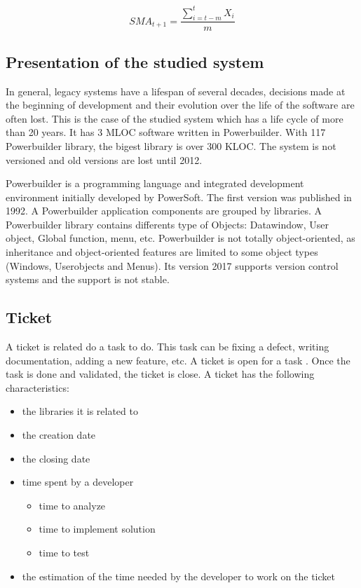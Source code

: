 \documentclass[10pt,conference]{IEEEtran}
\begin{document}
	\begin{equation}
	SMA_{t+1}=\frac{\sum\limits_{i=t-m}^t X_i}{m}
	\end{equation}
	\subsection{Presentation of the studied system}
	In general, legacy systems have a lifespan of several decades, decisions made at the beginning of development and their evolution over the life of the software are often lost. 
	This is the case of the studied system  which has a life cycle of  more than 20 years. 
	It has 3 MLOC software written in Powerbuilder. With 117 Powerbuilder library, the  bigest library is  over 300 KLOC.
	The system is not versioned and old versions are lost until 2012.
	
	Powerbuilder is a programming language and integrated development environment initially developed by PowerSoft. The first version was published in 1992.
	A Powerbuilder application components are grouped by libraries.  
	A Powerbuilder library contains differents type of Objects: Datawindow, User object, Global function,  menu, etc. 
	Powerbuilder is not totally object-oriented, as inheritance and object-oriented features are limited to some object types (Windows, Userobjects and Menus). 
	Its version 2017 supports version control systems and the support is not stable. 
	    
	
	\subsection{Ticket}
	A ticket is related do a task to do. 
	This task can be fixing a defect, writing documentation, adding a new feature, etc. 
	A ticket is open for a task . 
	Once the task is done and validated, the ticket is close.
	A ticket has the following characteristics:
	\begin{itemize}
	\item the libraries it  is related to
	\item the creation date
	\item the closing date
	\item time spent by a developer
	\begin{itemize}
	\item time to analyze
	\item time to implement solution
	\item time to test
	\end{itemize}
	\item  the estimation of the time needed by the developer to work on the ticket
	\end{itemize}
	
\end{document}

